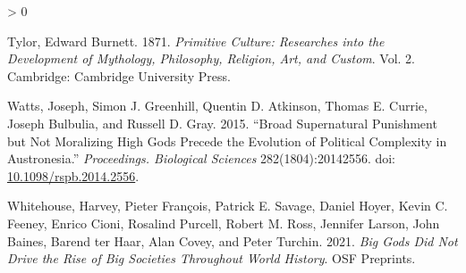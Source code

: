 \documentclass[
]{article}
\newlength{\cslhangindent}
\newenvironment{CSLReferences}[2] %
 {%
  \setlength{\parindent}{0pt}
  \ifodd #1 \everypar{\setlength{\hangindent}{\cslhangindent}}\ignorespaces\fi
  \ifnum #2 > 0
  \setlength{\parskip}{#2\baselineskip}
  \fi
 }%
 {}
\begin{document}
\begin{CSLReferences}{1}{0}
\leavevmode\hypertarget{ref-tylorPrimitiveCultureResearches1871}{}%
Tylor, Edward Burnett. 1871. \emph{Primitive {Culture}: {Researches} into the {Development} of {Mythology}, {Philosophy}, {Religion}, {Art}, and {Custom}}. Vol. 2. Cambridge: Cambridge University Press.

\leavevmode\hypertarget{ref-wattsBroadSupernaturalPunishment2015}{}%
Watts, Joseph, Simon J. Greenhill, Quentin D. Atkinson, Thomas E. Currie, Joseph Bulbulia, and Russell D. Gray. 2015. {``Broad Supernatural Punishment but Not Moralizing High Gods Precede the Evolution of Political Complexity in {Austronesia}.''} \emph{Proceedings. Biological Sciences} 282(1804):20142556. doi: \href{https://doi.org/10.1098/rspb.2014.2556}{10.1098/rspb.2014.2556}.

\leavevmode\hypertarget{ref-whitehouseBigGodsDid2021}{}%
Whitehouse, Harvey, Pieter François, Patrick E. Savage, Daniel Hoyer, Kevin C. Feeney, Enrico Cioni, Rosalind Purcell, Robert M. Ross, Jennifer Larson, John Baines, Barend ter Haar, Alan Covey, and Peter Turchin. 2021. \emph{Big {Gods} Did Not Drive the Rise of Big Societies Throughout World History}. OSF Preprints.

\end{CSLReferences}
\end{document}
